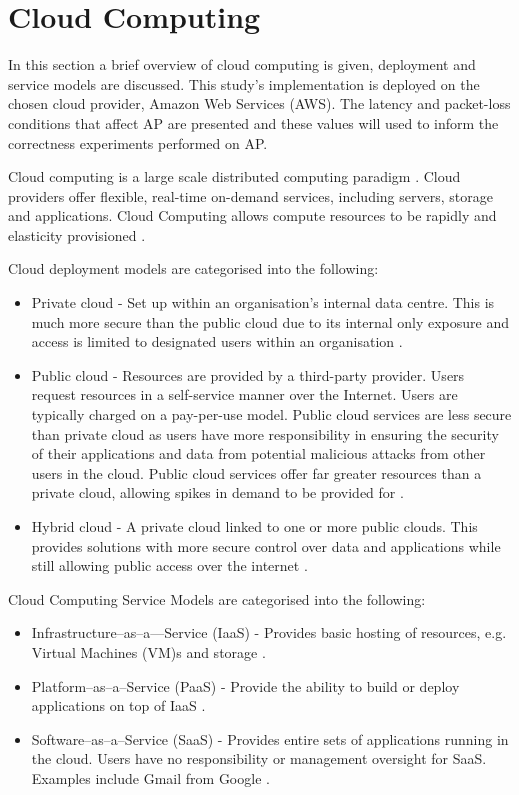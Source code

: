 \section{Cloud Computing}
In this section a brief overview of cloud computing is given, deployment and service models are discussed. This study's implementation is deployed on the chosen cloud provider, Amazon Web Services (AWS). The latency and packet-loss conditions that affect AP are presented and these values will used to inform the correctness experiments performed on AP.


Cloud computing is a large scale distributed computing paradigm \cite{2008CloudComputing}. Cloud providers offer flexible, real-time on-demand services, including servers, storage and applications. Cloud Computing allows compute resources to be rapidly and elasticity provisioned \cite{2012CloudComputing}.

Cloud deployment models are categorised into the following:
\begin{itemize}
\item Private cloud - Set up within an organisation's internal data centre. This is much more secure than the public cloud due to its internal only exposure and access is limited to designated users within an organisation \cite{2012CloudComputing}.
\item Public cloud - Resources are provided by a third-party provider. Users request resources in a self-service manner over the Internet. Users are typically charged on a pay-per-use model. Public cloud services are less secure than private cloud as users have more responsibility in ensuring the security of their applications and data from potential malicious attacks from other users in the cloud. Public cloud services offer far greater resources than a private cloud, allowing spikes in demand to be provided for  \cite{2012CloudComputing}.
\item Hybrid cloud - A private cloud linked to one or more public clouds. This provides solutions with more secure control over data and applications while still allowing public access over the internet \cite{2012CloudComputing}.
\end{itemize}

Cloud Computing Service Models are categorised into the following:
\begin{itemize}
	\item Infrastructure–as–a—Service (IaaS) - Provides basic hosting of resources, e.g. Virtual Machines (VM)s and storage \cite{2012CloudComputing}.
	\item Platform–as–a–Service (PaaS) - Provide the ability to build or deploy applications on top of IaaS \cite{2012CloudComputing}.
	\item Software–as–a–Service (SaaS) - Provides entire sets of applications running in the cloud. Users have no responsibility or management oversight for SaaS. Examples include Gmail from Google \cite{2012CloudComputing}.	
\end{itemize}

